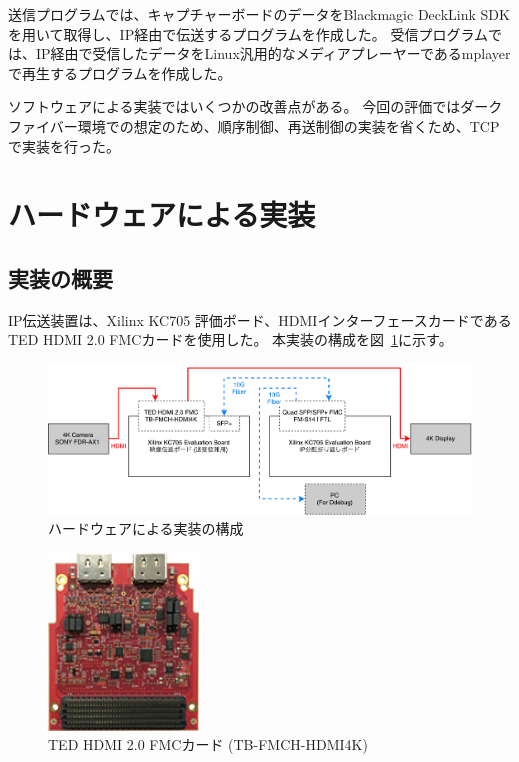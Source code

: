 送信プログラムでは、キャプチャーボードのデータをBlackmagic DeckLink SDK\cite{bmd-decklink-sdk}を用いて取得し、IP経由で伝送するプログラムを作成した。
受信プログラムでは、IP経由で受信したデータをLinux汎用的なメディアプレーヤーであるmplayerで再生するプログラムを作成した\cite{bmd-4k-streaming}。


ソフトウェアによる実装ではいくつかの改善点がある。
今回の評価ではダークファイバー環境での想定のため、順序制御、再送制御の実装を省くため、TCPで実装を行った。

\section{ハードウェアによる実装}

\subsection{実装の概要}

IP伝送装置は、Xilinx KC705 評価ボード\cite{xilinx-kc705}、HDMIインターフェースカードであるTED HDMI 2.0 FMCカード\cite{ted-hdmi4k}を使用した。
本実装の構成を図~\ref{fig:fpga-implement-flow}に示す。

\begin{figure}[htbp]
  \begin{center}
    \includegraphics[bb=0 0 841 299,width=15.5cm]{img/fpga-implement-flow.pdf}
  \end{center}
  \caption{ハードウェアによる実装の構成}
  \label{fig:fpga-implement-flow}
\end{figure}

\begin{figure}[htbp]
  \begin{center}
    \includegraphics[bb=0 0 137 161,width=4cm]{img/ted-4k-fmc-card.jpg}
  \end{center}
  \caption{TED HDMI 2.0 FMCカード (TB-FMCH-HDMI4K)}
  \label{fig:ted-4k-fmc-card}
\end{figure}

